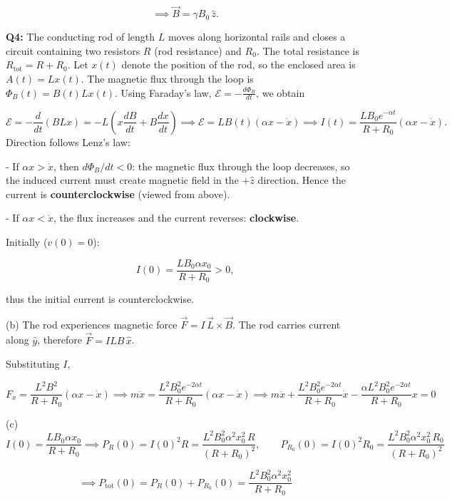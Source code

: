 \documentclass[a4paper,12pt]{article}
\begin{document}
\[
\implies
\boxed{
\vec B
=
\gamma B_0\,\hat z
}.
\]


\textbf{Q4:} The conducting rod of length \(L\) moves along horizontal rails and closes a circuit containing two resistors \(R\) (rod resistance) and \(R_0\). The total resistance is $R_{\mathrm{tot}}=R+R_0$. Let \(x(t)\) denote the position of the rod, so the enclosed area is $A(t)=Lx(t)$. The magnetic flux through the loop is $\Phi_B(t)=B(t)Lx(t)$. Using Faraday's law, $\mathcal E=-\frac{d\Phi_B}{dt}$, we obtain

\[
\mathcal E
=
-\frac{d}{dt}\left(BLx\right)
=
-L\left(x\frac{dB}{dt}+B\frac{dx}{dt}\right) \implies \mathcal E=L B(t)\left(\alpha x-\dot x\right) \implies \boxed{
I(t)=\frac{L B_0 e^{-\alpha t}}{R+R_0}
\left(\alpha x-\dot x\right)
}.
\]
Direction follows Lenz's law:

- If \(\alpha x>\dot x\), then \(d\Phi_B/dt<0\): the magnetic flux through the loop decreases, so the induced current must create magnetic field in the \(+\hat z\) direction.
  Hence the current is \textbf{counterclockwise} (viewed from above).

- If \(\alpha x<\dot x\), the flux increases and the current reverses:
  \textbf{clockwise}.

Initially (\(v(0)=0\)):

\[
I(0)=
\frac{L B_0\alpha x_0}{R+R_0}>0,
\]

thus the initial current is counterclockwise.


(b) The rod experiences magnetic force $\vec F = I\,\vec L\times \vec B$. The rod carries current along \(\hat y\), therefore $\vec F = I L B\,\hat x$.

Substituting \(I\),

\[
F_x=
\frac{L^2 B^2}{R+R_0}
(\alpha x-\dot x) \implies m\ddot x
=
\frac{L^2 B_0^2 e^{-2\alpha t}}{R+R_0}
(\alpha x-\dot x) \implies \boxed{
m\ddot x
+
\frac{L^2 B_0^2 e^{-2\alpha t}}{R+R_0}\dot x
-
\frac{\alpha L^2 B_0^2 e^{-2\alpha t}}{R+R_0}x
=0
}
\]

(c) 
\[
I(0)=
\frac{L B_0\alpha x_0}{R+R_0} \implies P_R(0)=I(0)^2R
=
\frac{L^2B_0^2\alpha^2x_0^2\,R}
{(R+R_0)^2}, \qquad P_{R_0}(0)=I(0)^2R_0
=
\frac{L^2B_0^2\alpha^2x_0^2\,R_0}
{(R+R_0)^2}
\]

\[
\implies
\boxed{
P_{\mathrm{tot}}(0)
=
P_R(0)+P_{R_0}(0)
=
\frac{L^2B_0^2\alpha^2x_0^2}{R+R_0}
}
\]
\end{document}
